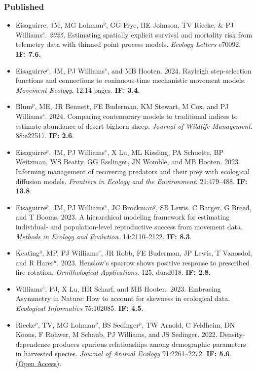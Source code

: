 \subsubsection*{Published}
\begin{itemize}
\item Eisaguirre, JM, MG Lohman$^g$, GG Frye, HE Johnson, TV Riecke, \& PJ Williams$^s$. \emph{2025}. Estimating spatially explicit survival and mortality risk from telemetry data with thinned point process models. \emph{Ecology Letters} e70092. \textbf{IF: 7.6}.
\item Eisaguirre$^p$, JM, PJ Williams$^s$, and MB Hooten. 2024. Rayleigh step-selection functions and connections to coninuous-time mechanistic movement models. \emph{Movement Ecology}. 12:14 pages. \textbf{IF: 3.4}.
\item Blum$^p$, ME, JR Bennett, FE Buderman, KM Stewart, M Cox, and PJ Williams$^s$. 2024. Comparing contemorary models to traditional indices to estimate abundance of desert bighorn sheep. \emph{Journal of Wildlife Management}. 88:e22517. \textbf{IF: 2.6}.
\item Eisaguirre$^p$, JM, PJ Williams$^s$, X Lu, ML Kissling, PA Schuette, BP Weitzman, WS Beatty, GG Esslinger, JN Womble, and MB Hooten. 2023. Informing management of recovering predators and their prey with ecological diffusion models. \emph{Frontiers in Ecology and the Environment}. 21:479--488. \textbf{IF: 13.8}.
\item Eisaguirre$^p$, JM, PJ Williams$^s$, JC Brockman$^g$, SB Lewis, C Barger, G Breed, and T Booms. 2023. A hierarchical modeling framework for estimating individual- and population-level reproductive success from movement data. \emph{Methods in Ecology and Evolution}. 14:2110--2122. \textbf{IF: 8.3}.
\item Keating$^g$, MP, PJ Williams$^s$, JR Robb, FE Buderman, JP Lewis, T Vanosdol, and R Harer$^u$. 2023. Henslow's sparrow shows positive response to prescribed fire rotation. \emph{Ornithological Applications}. 125, duad018. \textbf{IF: 2.8}.
\item Williams$^s$, PJ, X Lu, HR Scharf, and MB Hooten. 2023. Embracing Asymmetry in Nature: How to account for skewness in ecological data. \emph{Ecological Informatics} 75:102085. \textbf{IF: 4.5}.
\item Riecke$^p$, TV, MG Lohman$^g$, BS Sedinger$^p$, TW Arnold, C Feldheim, DN Koons, F Rohwer, M Schaub, PJ Williams, and JS Sedinger. 2022. Density-dependence produces spurious relationships among demographic parameters in harvested species. \emph{Journal of Animal Ecology} 91:2261--2272. \textbf{IF: 5.6}. \href{https://besjournals.onlinelibrary.wiley.com/doi/10.1111/1365-2656.13807}{(Open Access)}.

\end{itemize}
